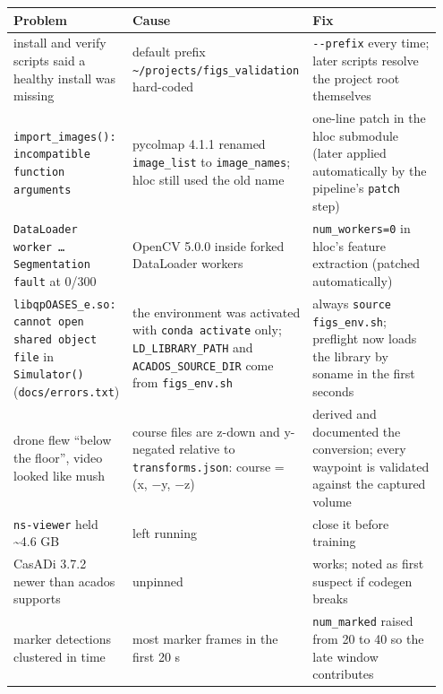 \documentclass[11pt,a4paper]{article}
\newcommand{\code}[1]{\texttt{#1}}
\begin{document}
\begin{center}\small
\begin{tabular}{@{}>{\raggedright\arraybackslash}p{0.266\linewidth}>{\raggedright\arraybackslash}p{0.381\linewidth}>{\raggedright\arraybackslash}p{0.301\linewidth}@{}}
\toprule
\textbf{Problem} & \textbf{Cause} & \textbf{Fix} \\
\midrule
install and verify scripts said a healthy install was missing & default prefix \code{\textasciitilde{}/\allowbreak{}projects/\allowbreak{}figs\_\allowbreak{}validation} hard-coded & \code{-{}-prefix} every time; later scripts resolve the project root themselves \\
\code{import\_\allowbreak{}images(): incompatible function arguments} & pycolmap 4.1.1 renamed \code{image\_\allowbreak{}list} to \code{image\_\allowbreak{}names}; hloc still used the old name & one-line patch in the hloc submodule (later applied automatically by the pipeline's \code{patch} step) \\
\code{DataLoader worker … Segmentation fault} at 0/300 & OpenCV 5.0.0 inside forked DataLoader workers & \code{num\_\allowbreak{}workers=0} in hloc's feature extraction (patched automatically) \\
\code{libqpOASES\_\allowbreak{}e.so: cannot open shared object file} in \code{Simulator()} (\code{docs/\allowbreak{}errors.txt}) & the environment was activated with \code{conda activate} only; \code{LD\_\allowbreak{}LIBRARY\_\allowbreak{}PATH} and \code{ACADOS\_\allowbreak{}SOURCE\_\allowbreak{}DIR} come from \code{figs\_\allowbreak{}env.sh} & always \code{source figs\_\allowbreak{}env.sh}; preflight now loads the library by soname in the first seconds \\
drone flew ``below the floor'', video looked like mush & course files are z-down and y-negated relative to \code{transforms.json}: course = (x, $-$y, $-$z) & derived and documented the conversion; every waypoint is validated against the captured volume \\
\code{ns-viewer} held \textasciitilde{}4.6 GB & left running & close it before training \\
CasADi 3.7.2 newer than acados supports & unpinned & works; noted as first suspect if codegen breaks \\
marker detections clustered in time & most marker frames in the first 20 s & \code{num\_\allowbreak{}marked} raised from 20 to 40 so the late window contributes \\
\bottomrule
\end{tabular}
\end{center}
\end{document}
